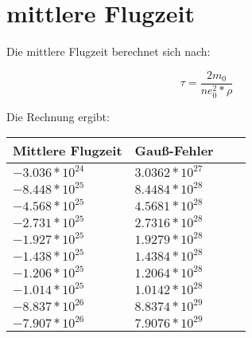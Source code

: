 \documentclass[titlepage=firstcover, captions=tableheading]{scrartcl}
\begin{document}
\section{mittlere Flugzeit}

Die mittlere Flugzeit berechnet sich nach:

\begin{displaymath}
    \tau = \frac{2m_0}{ne_0^2*\rho}
\end{displaymath}

Die Rechnung ergibt:
\begin{center}
    \begin{tabular}{l @{${}\pm{}$}lll}\\
    \toprule
    Mittlere Flugzeit & Gauß-Fehler\\
    \midrule
    $-3.036*10^{24}$ &  $3.0362*10^{27}$ \\
    $-8.448*10^{25}$ &  $8.4484*10^{28}$ \\
    $-4.568*10^{25}$ &  $4.5681*10^{28}$ \\
    $-2.731*10^{25}$ &  $2.7316*10^{28}$ \\
    $-1.927*10^{25}$ &  $1.9279*10^{28}$ \\
    $-1.438*10^{25}$ &  $1.4384*10^{28}$ \\
    $-1.206*10^{25}$ &  $1.2064*10^{28}$ \\
    $-1.014*10^{25}$ &  $1.0142*10^{28}$ \\
    $-8.837*10^{26}$ &  $8.8374*10^{29}$ \\
    $-7.907*10^{26}$ &  $7.9076*10^{29}$ \\
    \bottomrule
    \end{tabular}
\end{center}
\end{document}

